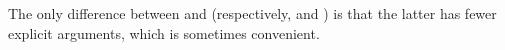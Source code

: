 \begin{code}
\AgdaSpace{}%
\AgdaSpace{}%
\AgdaSpace{}%
\AgdaSpace{}%
\AgdaSpace{}%
\<%
\\
%
\>[1]\AgdaSpace{}%
\AgdaSymbol{\AgdaUnderscore{}}\AgdaSpace{}%
\AgdaSymbol{\AgdaUnderscore{}}\AgdaSpace{}%
\AgdaSymbol{\AgdaUnderscore{}}\AgdaSpace{}%
\AgdaSpace{}%
\AgdaSpace{}%
\AgdaSymbol{=}\AgdaSpace{}%
\<%
\\
%
\\[\AgdaEmptyExtraSkip]%
%
\>[1]\AgdaSpace{}%
\AgdaSymbol{:}\AgdaSpace{}%
\AgdaSymbol{\{}\AgdaSpace{}%
\AgdaSpace{}%
\AgdaSpace{}%
\AgdaSymbol{:}\AgdaSpace{}%
\AgdaSymbol{\}}\AgdaSpace{}%
\AgdaSpace{}%
\AgdaSpace{}%
\AgdaSpace{}%
\AgdaSpace{}%
\AgdaSpace{}%
\AgdaSpace{}%
\AgdaSpace{}%
\AgdaSpace{}%
\AgdaSpace{}%
\AgdaSpace{}%
\AgdaSpace{}%
\<%
\\
%
\>[1]\AgdaSpace{}%
\AgdaSpace{}%
\AgdaSpace{}%
\AgdaSymbol{=}\AgdaSpace{}%
\<%
\end{code}
\ccpad
The only difference between  and  (respectively,  and ) is that the latter has fewer explicit arguments, which is sometimes convenient.

